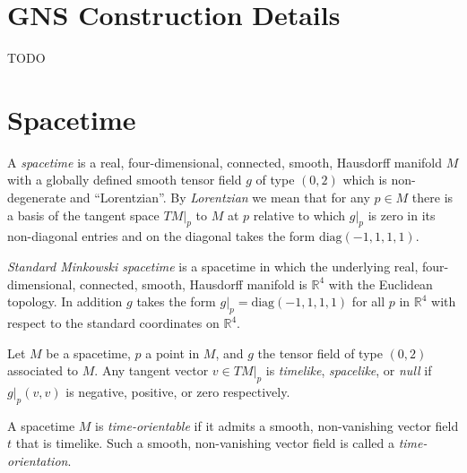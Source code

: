\section{GNS Construction Details}\label{sctn:gns-construction-details}
TODO

\section{Spacetime}\label{sctn:spacetime}
\begin{definition}[Spacetime]
    \label{def:spacetime}
    A \textit{spacetime} is a real, four-dimensional, connected, smooth, Hausdorff manifold $M$ with a globally defined smooth tensor field $g$ of type $(0,2)$ which is non-degenerate and ``Lorentzian''. By \textit{Lorentzian} we mean that for any $p \in M$ there is a basis of the tangent space $TM|_p$ to $M$ at $p$ relative to which $g|_p$ is zero in its non-diagonal entries and on the diagonal takes the form $\text{diag}(-1,1,1,1)$.
\end{definition}

\begin{definition}
    \label{def:standard-minkowski-spacetime}
    \textit{Standard Minkowski spacetime} is a spacetime in which the underlying real, four-dimensional, connected, smooth, Hausdorff manifold is $\mathbb{R}^4$ with the Euclidean topology. In addition $g$ takes the form $g|_p=\text{diag}(-1,1,1,1)$ for all $p$ in $\mathbb{R}^4$ with respect to the standard coordinates on $\mathbb{R}^4$.
\end{definition}

\begin{definition}
    \label{def:timelike-spacelike-null-vectors}
    Let $M$ be a spacetime, $p$ a point in $M$, and $g$ the tensor field of type $(0,2)$ associated to $M$. Any tangent vector $v \in TM|_p$ is \textit{timelike}, \textit{spacelike}, or \textit{null} if $g|_p(v,v)$ is negative, positive, or zero respectively.
\end{definition}

\begin{definition}
    \label{def:time-orientable}
    A spacetime $M$ is \textit{time-orientable} if it admits a smooth, non-vanishing vector field $t$ that is timelike. Such a smooth, non-vanishing vector field is called a \textit{time-orientation}.
\end{definition}

